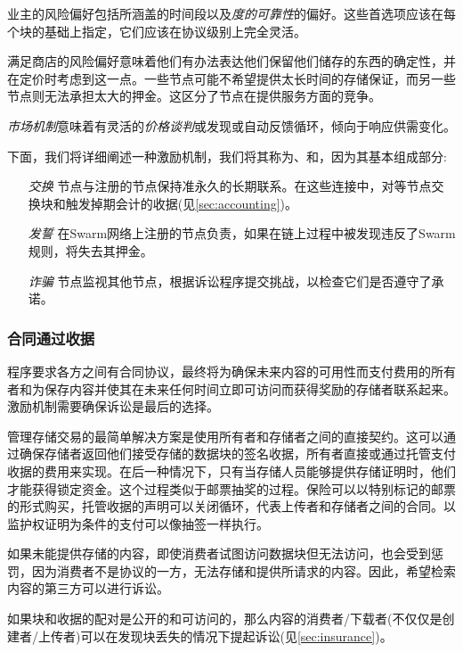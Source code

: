 业主的风险偏好包括所涵盖的时间段以及\emph{度的可靠性}的偏好。这些首选项应该在每个块的基础上指定，它们应该在协议级别上完全灵活。

满足商店的风险偏好意味着他们有办法表达他们保留他们储存的东西的确定性，并在定价时考虑到这一点。一些节点可能不希望提供太长时间的存储保证，而另一些节点则无法承担太大的押金。这区分了节点在提供服务方面的竞争。

\emph{市场机制}意味着有灵活的\emph{价格谈判}或发现或自动反馈循环，倾向于响应供需变化。

下面，我们将详细阐述一种激励机制，我们将其称为、和，因为其基本组成部分:

\begin{itemize}
\item[\emph{交换}]
  节点与注册的节点保持准永久的长期联系。在这些连接中，对等节点交换块和触发掉期会计的收据(见\ref{sec:accounting})。
  
\item[\emph{发誓}]
  在Swarm网络上注册的节点负责，如果在链上过程中被发现违反了Swarm规则，将失去其押金。

\item[\emph{诈骗}]
  节点监视其他节点，根据诉讼程序提交挑战，以检查它们是否遵守了承诺。

\end{itemize}

\subsubsection{合同通过收据}

程序要求各方之间有合同协议，最终将为确保未来内容的可用性而支付费用的所有者和为保存内容并使其在未来任何时间立即可访问而获得奖励的存储者联系起来。激励机制需要确保诉讼是最后的选择。

管理存储交易的最简单解决方案是使用所有者和存储者之间的直接契约。这可以通过确保存储者返回他们接受存储的数据块的签名收据，所有者直接或通过托管支付收据的费用来实现。在后一种情况下，只有当存储人员能够提供存储证明时，他们才能获得锁定资金。这个过程类似于邮票抽奖的过程。保险可以以特别标记的邮票的形式购买，托管收据的声明可以关闭循环，代表上传者和存储者之间的合同。以监护权证明为条件的支付可以像抽签一样执行。

如果未能提供存储的内容，即使消费者试图访问数据块但无法访问，也会受到惩罚，因为消费者不是协议的一方，无法存储和提供所请求的内容。因此，希望检索内容的第三方可以进行诉讼。

如果块和收据的配对是公开的和可访问的，那么内容的消费者/下载者(不仅仅是创建者/上传者)可以在发现块丢失的情况下提起诉讼(见\ref{sec:insurance})。 

